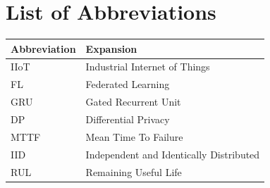 \chapter*{List of Abbreviations}
\thispagestyle{plain}
\begin{tabularx}{\textwidth}{@{}l X@{}}
\toprule
\textbf{Abbreviation} & \textbf{Expansion} \\
\midrule
IIoT & Industrial Internet of Things \\
FL & Federated Learning \\
GRU & Gated Recurrent Unit \\
DP & Differential Privacy \\
MTTF & Mean Time To Failure \\
IID & Independent and Identically Distributed \\
RUL & Remaining Useful Life \\
\bottomrule
\end{tabularx}

\clearpage
{}
